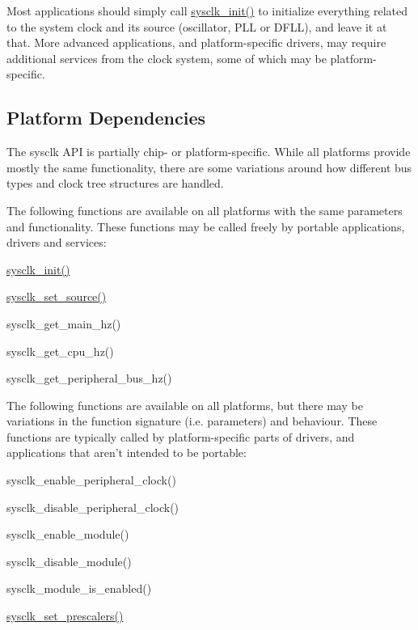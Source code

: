 \-Most applications should simply call \hyperlink{group__sysclk__group_ga242399e48a97739c88b4d0c00f6101de}{sysclk\-\_\-init()} to initialize everything related to the system clock and its source (oscillator, \-P\-L\-L or \-D\-F\-L\-L), and leave it at that. \-More advanced applications, and platform-\/specific drivers, may require additional services from the clock system, some of which may be platform-\/specific.\hypertarget{group__sysclk__group_sysclk_group_platform}{}\subsection{\-Platform Dependencies}\label{group__sysclk__group_sysclk_group_platform}
\-The sysclk \-A\-P\-I is partially chip-\/ or platform-\/specific. \-While all platforms provide mostly the same functionality, there are some variations around how different bus types and clock tree structures are handled.

\-The following functions are available on all platforms with the same parameters and functionality. \-These functions may be called freely by portable applications, drivers and services\-:
\begin{DoxyItemize}
\item \hyperlink{group__sysclk__group_ga242399e48a97739c88b4d0c00f6101de}{sysclk\-\_\-init()}
\item \hyperlink{group__sysclk__group_ga222a121dfaac21b0c0af9d4dcb39496c}{sysclk\-\_\-set\-\_\-source()}
\item sysclk\-\_\-get\-\_\-main\-\_\-hz()
\item sysclk\-\_\-get\-\_\-cpu\-\_\-hz()
\item sysclk\-\_\-get\-\_\-peripheral\-\_\-bus\-\_\-hz()
\end{DoxyItemize}

\-The following functions are available on all platforms, but there may be variations in the function signature (i.\-e. parameters) and behaviour. \-These functions are typically called by platform-\/specific parts of drivers, and applications that aren't intended to be portable\-:
\begin{DoxyItemize}
\item sysclk\-\_\-enable\-\_\-peripheral\-\_\-clock()
\item sysclk\-\_\-disable\-\_\-peripheral\-\_\-clock()
\item sysclk\-\_\-enable\-\_\-module()
\item sysclk\-\_\-disable\-\_\-module()
\item sysclk\-\_\-module\-\_\-is\-\_\-enabled()
\item \hyperlink{group__sysclk__group_ga9e93d93c137135fee8a1a7102367042e}{sysclk\-\_\-set\-\_\-prescalers()}
\end{DoxyItemize}

